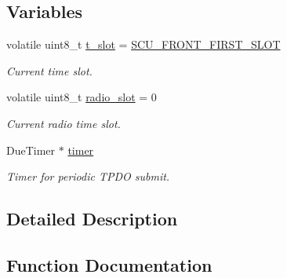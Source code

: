 \subsection*{Variables}
\begin{DoxyCompactItemize}
\item 
\mbox{\label{group___c_a_nopen__timer__module_ga38a43dbb3c9d41a62672688eb57fa33f}} 
volatile uint8\+\_\+t \mbox{\hyperlink{group___c_a_nopen__timer__module_ga38a43dbb3c9d41a62672688eb57fa33f}{t\+\_\+slot}} = \mbox{\hyperlink{group___c_a_nopen__timer__module_ga5bb58b675652213c5b20458ab611f9fb}{S\+C\+U\+\_\+\+F\+R\+O\+N\+T\+\_\+\+F\+I\+R\+S\+T\+\_\+\+S\+L\+OT}}
\begin{DoxyCompactList}\small\item\em Current time slot. \end{DoxyCompactList}\item 
\mbox{\label{group___c_a_nopen__timer__module_gac230d484e56093c9ba05a68a6f954ae6}} 
volatile uint8\+\_\+t \mbox{\hyperlink{group___c_a_nopen__timer__module_gac230d484e56093c9ba05a68a6f954ae6}{radio\+\_\+slot}} = 0
\begin{DoxyCompactList}\small\item\em Current radio time slot. \end{DoxyCompactList}\item 
\mbox{\label{group___c_a_nopen__timer__module_ga76a145cc4b1fbdcbf86505111dfc6b21}} 
Due\+Timer $\ast$ \mbox{\hyperlink{group___c_a_nopen__timer__module_ga76a145cc4b1fbdcbf86505111dfc6b21}{timer}}
\begin{DoxyCompactList}\small\item\em Timer for periodic T\+P\+DO submit. \end{DoxyCompactList}\end{DoxyCompactItemize}


\subsection{Detailed Description}


\subsection{Function Documentation}
\mbox{\label{group___c_a_nopen__timer__module_gafa75192a3238525618f8cb83004930cc}} 
